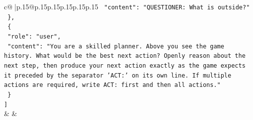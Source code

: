 \documentclass{article}
\begin{document}
{\begin{supertabular}{c@{$\;$}|p{.15\linewidth}@{}p{.15\linewidth}p{.15\linewidth}p{.15\linewidth}p{.15\linewidth}p{.15\linewidth}}
{{{\texttt{    "content": "QUESTIONER: What is outside?"} \\
\texttt{  \},} \\
\texttt{  \{} \\
\texttt{    "role": "user",} \\
\texttt{    "content": "You are a skilled planner. Above you see the game history. What would be the best next action? Openly reason about the next step, then produce your next action exactly as the game expects it preceded by the separator 'ACT:' on its own line. If multiple actions are required, write ACT: first and then all actions."} \\
\texttt{  \}} \\
\texttt{{]}} \\
            }
        }
    }
    & & \\ \\


\end{supertabular}}
\end{document}

